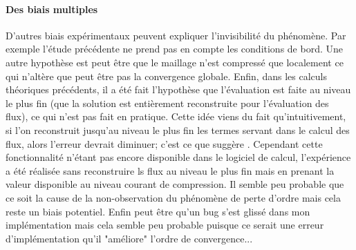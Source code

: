     \paragraph{Des biais multiples}
        D'autres biais expérimentaux peuvent expliquer l'invisibilité du phénomène.
        Par exemple l'étude précédente ne prend pas en compte les conditions de bord.
        Une autre hypothèse est peut être que le maillage n'est compressé que localement 
        ce qui n'altère que peut être pas la convergence globale. 
        Enfin, dans les calculs théoriques précédents, il a été fait l'hypothèse que l'évaluation est faite au niveau le plus fin 
        (que la solution est entièrement reconstruite pour l'évaluation des flux), ce qui n'est pas fait en pratique. Cette idée viens du fait qu'intuitivement, 
        si l'on reconstruit jusqu'au niveau le plus fin les termes servant dans le calcul des flux, alors l'erreur devrait diminuer; c'est ce que suggère \cite{belloti_et_al_2025,Massot2025_meshAdaptation}.
        Cependant cette fonctionnalité n'étant pas encore disponible dans le logiciel de calcul, l'expérience a été réalisée sans reconstruire ls flux au niveau 
        le plus fin mais en prenant la valeur disponible au niveau courant de compression. Il semble peu probable que ce soit la cause de la non-observation du phénomène 
        de perte d'ordre mais cela reste un biais potentiel. Enfin peut être qu'un bug s'est glissé dans mon implémentation mais cela semble peu probable 
        puisque ce serait une erreur d'implémentation qu'il "améliore" l'ordre de convergence...
